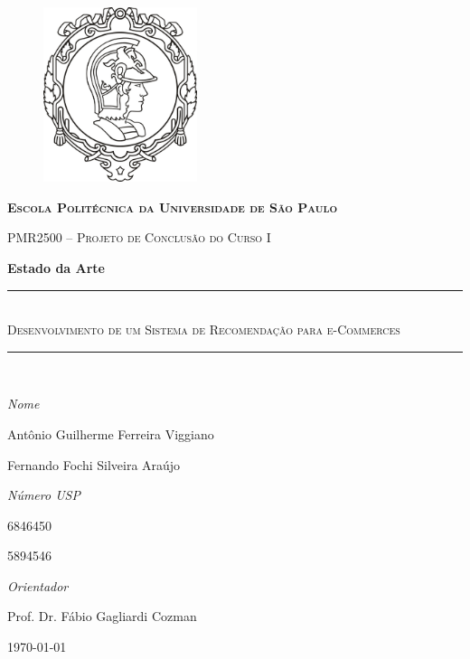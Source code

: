 \begin{center}
\begin{figure}[ht]
    \begin{center}
    \includegraphics[width=0.4\textwidth]{img/logo_poli}
    \end{center}
    \label{logo_poli}
\end{figure}
\end{center}

\begin{center}
\textbf{\textsc{Escola Politécnica da Universidade de São Paulo}}

\textsc{PMR2500 -- Projeto de Conclusão do Curso I}

\textbf{\Large Estado da Arte}
\end{center}
\begin{center}
\vspace{2cm}
\hrule  ~\\[0.5cm]
{ \huge \textsc{Desenvolvimento de um Sistema de Recomendação para e-Commerces}}\\[0.8cm]

\hrule  ~\\[0.5cm]

\end{center}


\vfill

\begin{minipage}{0.65\textwidth} 
	\large\emph{Nome} 
	
	\large{Antônio Guilherme Ferreira Viggiano}
		
	\large{Fernando Fochi Silveira Araújo}  

\end{minipage}
\begin{minipage}{0.35\textwidth} 
	\large\emph{Número USP}
	
	6846450
	
	5894546
\end{minipage}

\vfill

\begin{center}
	\large\emph{Orientador}

	\large{Prof. Dr. Fábio Gagliardi Cozman}
\end{center}

\vfill

\begin{center}
	\today
\end{center}
